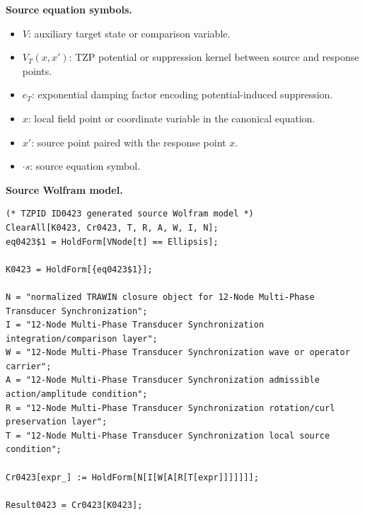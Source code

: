 \begin{minipage}[t]{0.49\linewidth}
\begingroup
\small
\raggedright
\textbf{Source equation symbols.}\par
\begin{itemize}[leftmargin=1.35em,itemsep=1pt,topsep=1pt,parsep=0pt]
    \item $V$: auxiliary target state or comparison variable.
    \item $V_{T}(x,x')$: TZP potential or suppression kernel between source and response points.
    \item $e_T$: exponential damping factor encoding potential-induced suppression.
    \item $x$: local field point or coordinate variable in the canonical equation.
    \item $x'$: source point paired with the response point $x$.
    \item $\cdot s$: source equation symbol.
\end{itemize}
\endgroup
\end{minipage}\hfill
\begin{minipage}[t]{0.47\linewidth}
\begingroup
\scriptsize
\raggedright
\textbf{Source Wolfram model.}\par
\begin{Verbatim}[fontsize=\tiny,breaklines=true,breakanywhere=true]
(* TZPID ID0423 generated source Wolfram model *)
ClearAll[K0423, Cr0423, T, R, A, W, I, N];
eq0423$1 = HoldForm[VNode[t] == Ellipsis];

K0423 = HoldForm[{eq0423$1}];

N = "normalized TRAWIN closure object for 12-Node Multi-Phase Transducer Synchronization";
I = "12-Node Multi-Phase Transducer Synchronization integration/comparison layer";
W = "12-Node Multi-Phase Transducer Synchronization wave or operator carrier";
A = "12-Node Multi-Phase Transducer Synchronization admissible action/amplitude condition";
R = "12-Node Multi-Phase Transducer Synchronization rotation/curl preservation layer";
T = "12-Node Multi-Phase Transducer Synchronization local source condition";

Cr0423[expr_] := HoldForm[N[I[W[A[R[T[expr]]]]]]];

Result0423 = Cr0423[K0423];
\end{Verbatim}
\endgroup
\end{minipage}

